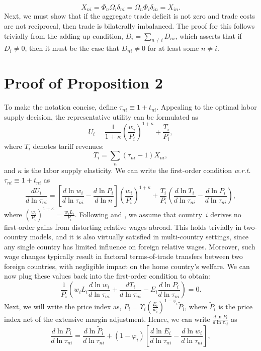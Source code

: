 \documentclass[12pt]{article}
\begin{document}
\[
X_{ni}=\Phi_{n}\Omega_{i}\delta_{ni}=\Omega_{n}\Phi_{i}\delta_{in}=X_{in}.
\]
Next, we must show that if the aggregate trade deficit is not zero and trade costs are not reciprocal, then trade is bilaterally imbalanced. The proof for this follows trivially from the adding up condition, $D_i=\sum_{n\neq i} D_{ni}$, which asserts that if $D_i\neq 0$, then it must be the case that $D_{ni}\neq 0$ for at least some $n\neq i$.
\section{Proof of Proposition 2\label{sec: A1}}

To make the notation concise, define $\tau_{ni}\equiv1+t_{ni}$. Appealing to the optimal labor supply decision, the representative utility can be formulated as
\[
U_{i}=\frac{1}{1+\kappa}\left(\frac{w_{i}}{P_{i}}\right)^{1+\kappa}+\frac{T_{i}}{P_{i}},
\]
where $T_i$  denotes tariff revenues:
\[
T_{i}=\sum_{n}\left(\tau_{ni}-1\right)X_{ni},
 \]
and $\kappa$ is the labor supply elasticity. We can write the first-order condition \emph{w.r.t.} $\tau_{ni}\equiv1+t_{ni}$ as
\[
\frac{dU_{i}}{d\ln\tau_{ni}}=\left[\frac{d\ln w_{i}}{d\ln\tau_{ni}}-\frac{d\ln P_{i}}{d\ln n}\right]\left(\frac{w_{i}}{P_{i}}\right)^{1+\kappa}+\frac{T_{i}}{P_{i}}\left(\frac{d\ln T_{i}}{d\ln\tau_{ni}}-\frac{d\ln P_{i}}{d\ln\tau_{ni}}\right),
\]
where $\left(\frac{w_{i}}{P_{i}}\right)^{1+\kappa}=\frac{w_{i}L_{i}}{P_{i}}$. Following \citet{lashkaripour2023profits} and \citet{FL2025}, we assume that country~$i$ derives no first-order gains from distorting relative wages abroad. This holds trivially in two-country models, and it is also virtually satisfied in multi-country settings, since any single country has limited influence on foreign relative wages. Moreover, such wage changes typically result in factoral terms-of-trade transfers between two foreign countries, with negligible impact on the home country's welfare. We can now plug these values back into the first-order condition to obtain:
\[
\frac{1}{P_{i}}\left(w_{i}L_{i}\frac{d\ln w_{i}}{d\ln\tau_{ni}}+\frac{d T_{i}}{d\ln\tau_{ni}}-E_{i}\frac{d\ln P_{i}}{d\ln\tau_{ni}}\right)=0.
\]
Next, we will write the price index as, $P_{i}=\Upsilon_{i}\left(\frac{E_{i}}{w_{i}}\right)^{1-\varphi_{i}}\tilde{P}_{i}$, where $\tilde{P}_{i}$ is the price index net of the extensive margin adjustment. Hence, we can write $\frac{d\ln P_{i}}{d\ln\tau_{ni}}$ as
\[ \frac{d\ln P_{i}}{d\ln\tau_{ni}}=\frac{d\ln\tilde{P}_{i}}{d\ln\tau_{ni}}+\left(1-\varphi_{i}\right)\left[\frac{d\ln E_{i}}{d\ln\tau_{ni}}-\frac{d\ln w_{i}}{d\ln\tau_{ni}}\right],
\]
\end{document}
